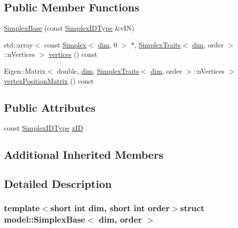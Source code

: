 \subsection*{Public Member Functions}
\begin{DoxyCompactItemize}
\item 
\hyperlink{structmodel_1_1_simplex_base_aa61005cc2601ee5721fbd89cffa3e28f}{Simplex\+Base} (const \hyperlink{structmodel_1_1_simplex_base_a0caaeafb7f385ed49b6463a9e54a127c}{Simplex\+I\+D\+Type} \&v\+I\+N)
\item 
std\+::array$<$ const \hyperlink{classmodel_1_1_simplex}{Simplex}$<$ \hyperlink{plot_nd_a_8m_a382f3ca768b275b8d563604f7fc7df73}{dim}, 0 $>$ $\ast$, \hyperlink{structmodel_1_1_simplex_traits}{Simplex\+Traits}$<$ \hyperlink{plot_nd_a_8m_a382f3ca768b275b8d563604f7fc7df73}{dim}, order $>$\+::n\+Vertices $>$ \hyperlink{structmodel_1_1_simplex_base_a82a11a03c6c82fddb6257a913f074941}{vertices} () const 
\item 
Eigen\+::\+Matrix$<$ double, \hyperlink{plot_nd_a_8m_a382f3ca768b275b8d563604f7fc7df73}{dim}, \hyperlink{structmodel_1_1_simplex_traits}{Simplex\+Traits}$<$ \hyperlink{plot_nd_a_8m_a382f3ca768b275b8d563604f7fc7df73}{dim}, order $>$\+::n\+Vertices $>$ \hyperlink{structmodel_1_1_simplex_base_a959f74e1a9bd521e03b42d66018dec93}{vertex\+Position\+Matrix} () const 
\end{DoxyCompactItemize}
\subsection*{Public Attributes}
\begin{DoxyCompactItemize}
\item 
const \hyperlink{structmodel_1_1_simplex_base_a0caaeafb7f385ed49b6463a9e54a127c}{Simplex\+I\+D\+Type} \hyperlink{structmodel_1_1_simplex_base_a477508d711a1cb001ccd895f88665a59}{x\+I\+D}
\end{DoxyCompactItemize}
\subsection*{Additional Inherited Members}


\subsection{Detailed Description}
\subsubsection*{template$<$short int dim, short int order$>$struct model\+::\+Simplex\+Base$<$ dim, order $>$}



